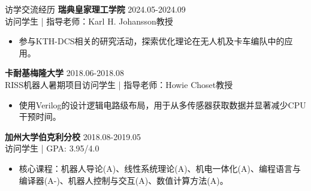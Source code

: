 \documentclass{resume} %
\newcommand{\trianglebullet}{$\mbox{\ensuremath{\rhd}}$}
\begin{document}
\begin{rSection}{访学交流经历}
    \textbf{瑞典皇家理工学院}  \hfill {2024.05-2024.09}
    \\ 访问学生 | 指导老师：Karl H. Johansson教授
    \begin{itemize}
        \item 参与KTH-DCS相关的研究活动，探索优化理论在无人机及卡车编队中的应用。
    \end{itemize}

    \textbf{卡耐基梅隆大学} \hfill {2018.06-2018.08} 
    \\ RISS机器人暑期项目访问学生 | 指导老师：Howie Choset教授
    \begin{itemize}
        \item 使用Verilog的设计逻辑电路级布局，用于从多传感器获取数据并显著减少CPU干预时间。
    \end{itemize}
    \textbf{加州大学伯克利分校}  \hfill {2018.08-2019.05} 
    \\ 访问学生 | GPA: 3.95/4.0 
    \begin{itemize}
        \item 核心课程：机器人导论(A)、线性系统理论(A)、机电一体化(A)、编程语言与编译器(A-)、机器人控制与交互(A)、数值计算方法(A)。
    \end{itemize}
\end{rSection}




\def\FormatName#1{%
    \def\myname{Junyan Su}%
    \edef\name{#1}%
    \ifx\name\myname
      \underline{#1}%
    \else
       #1%
    \fi
}
\end{document}
